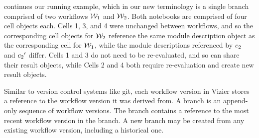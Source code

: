 


\begin{exam}
  continues our running example, which in our new terminology is a single branch comprised of two workflows $\mathcal W_1$ and $\mathcal W_2$.
  Both notebooks are comprised of four cell objects each.
  Cells 1, 3, and 4 were unchanged between workflows, and so the corresponding cell objects for $\mathcal W_2$ reference the same module description object as the corresponding cell for $\mathcal W_1$, while the module descriptions referenced by $c_2$ and ${c_2}'$ differ.
  Cells 1 and 3 do not need to be re-evaluated, and so can share their result objects, while Cells 2 and 4 both require re-evaluation and create new result objects.
\end{exam}

Similar to version control systems like git, each workflow version in Vizier stores a reference to the workflow version it was derived from.
A branch is an append-only sequence of workflow versions. %
The branch contains a reference to the most recent workflow version in the branch. %
A new branch may be created from any existing workflow version, including a historical one.

